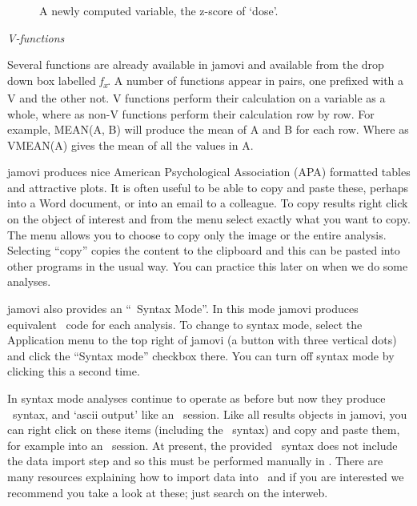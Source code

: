 \vspace*{1cm}
\begin{figure}[ht]
\begin{center}
\caption{A newly computed variable, the z-score of `dose'.}
\HR
\label{fig:computedvariable}
\end{center}
\end{figure}


{\it V-functions}

Several functions are already available in jamovi and available from the drop down box labelled {\it f\textsubscript{x}}. A number of functions appear in pairs, one prefixed with a V and the other not. V functions perform their calculation on a variable as a whole, where as non-V functions perform their calculation row by row. For example, MEAN(A, B) will produce the mean of A and B for each row. Where as VMEAN(A) gives the mean of all the values in A.


jamovi produces nice American Psychological Association (APA) formatted tables and attractive plots. It is often useful to be able to copy and paste these, perhaps into a Word document, or into an email to a colleague. To copy results right click on the object of interest and from the menu select exactly what you want to copy. The menu allows you to choose to copy only the image or the entire analysis. Selecting ``copy'' copies the content to the clipboard and this can be pasted into other programs in the usual way. You can practice this later on when we do some analyses.


jamovi also provides an “\R\ Syntax Mode”. In this mode jamovi produces equivalent \R\ code for each analysis. To change to syntax mode, select the Application menu to the top right of jamovi (a button with three vertical dots) and click the “Syntax mode” checkbox there. You can turn off syntax mode by clicking this a second time.

In syntax mode analyses continue to operate as before but now they produce \R\ syntax, and `ascii output’ like an \R\ session. Like all results objects in jamovi, you can right click on these items (including the \R\ syntax) and copy and paste them, for example into an \R\ session. At present, the provided \R\ syntax does not include the data import step and so this must be performed manually in \R. There are many resources explaining how to import data into \R\ and if you are interested we recommend you take a look at these; just search on the interweb. 


